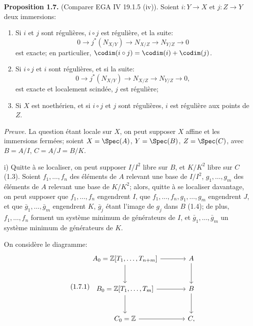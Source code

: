 \textbf{Proposition 1.7.} (Comparer EGA IV 19.1.5 (iv)). Soient $i:Y\longrightarrow X$ et $j:Z\longrightarrow Y$ deux immersions:
\begin{enumerate}[label=\roman*)]
\item Si $i$ et $j$ sont régulières, $i\circ j$ est régulière, et la suite:
\[
0\longrightarrow j^*(N_{X/Y})\longrightarrow N_{X/Z}\longrightarrow N_{Y/Z}\longrightarrow0
\]
est exacte; en particulier, $\codim(i\circ j)=\codim(i)+\codim(j)$.
\item Si $i\circ j$ et $i$ sont régulières, et si la suite:
\[
0\longrightarrow j^*(N_{X/Y})\longrightarrow N_{X/Z}\longrightarrow N_{Y/Z}\longrightarrow0,
\]
est exacte et localement scindée, $j$ est régulière;
\item Si $X$ est noethérien, et si $i\circ j$ et $j$ sont régulières, $i$ est régulière aux points de $Z$.
\end{enumerate}

\emph{Preuve.} La question étant locale sur $X$, on peut supposer $X$ affine et les immersions fermées; soient $X=\Spec(A)$, $Y=\Spec(B)$, $Z=\Spec(C)$, avec $B=A/I$, $C=A/J=B/K$.

i) Quitte à se localiser, on peut supposer $I/I^2$ libre sur $B$, et $K/K^2$ libre sur $C$ (1.3). Soient $f_1,\ldots,f_n$ des éléments de $A$ relevant une base de $I/I^2$, $g_1,\ldots,g_m$ des éléments de $A$ relevant une base de $K/K^2$; alors, quitte à se localiser davantage, on peut supposer que $f_1,\ldots,f_n$ engendrent $I$, que $f_1,\ldots,f_n,g_1,\ldots,g_m$ engendrent $J$, et que $\bar g_1,\ldots,\bar g_m$ engendrent $K$, $\bar g_j$ étant l'image de $g_j$ dans $B$ (1.4); de plus, $f_1,\ldots,f_n$ forment un système minimum de générateurs de $I$, et $\bar g_1,\ldots,\bar g_m$ un système minimum de générateurs de $K$.

On considère le diagramme:
\begin{equation}\tag{1.7.1}
\begin{tikzcd}[column sep=large,row sep=large]
A_0=\mathbb Z[T_1,\ldots,T_{n+m}] \arrow[r] \arrow[d] & A \arrow[d]\\
B_0=\mathbb Z[T_1,\ldots,T_m] \arrow[r] \arrow[d] & B \arrow[d]\\
C_0=\mathbb Z \arrow[r] & C,
\end{tikzcd}
\end{equation}

